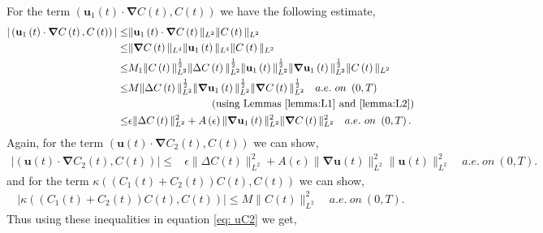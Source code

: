 \documentclass[final,3p,times]{elsarticle}
\theoremstyle{plain}
\theoremstyle{remark}
\theoremstyle{plain}
\theoremstyle{remark}
\begin{document}
For the term $\left(\mathbf u_1\left(t\right)\cdot\boldsymbol{\nabla} C\left(t\right),C\left(t\right)\right)$ we have the following estimate,
\begin{align}
    |\left(\mathbf u_1\left(t\right)\cdot\boldsymbol{\nabla} C\left(t\right),C\left(t\right)\right)|\le&\|\mathbf u_1\left(t\right) \cdot \boldsymbol{\nabla} C\left(t\right)\|_{L^2}\|C\left(t\right)\|_{L^2}\nonumber\\
    \le & \|\boldsymbol{\nabla} C\left(t\right)\|_{L^4}\|\mathbf u_1\left(t\right)\|_{L^4}\|C\left(t\right)\|_{L^2} \nonumber \\
    \le & M_1\| C\left(t\right)\|^{\frac{1}{2}}_{L^2}\|\Delta C\left(t\right)\|^{\frac{1}{2}}_{L^2}\|\mathbf u_1\left(t\right)\|^{\frac{1}{2}}_{L^2}\|\boldsymbol{\nabla}\mathbf u_1\left(t\right)\|^{\frac{1}{2}}_{L^2}\|C\left(t\right)\|_{L^2} \nonumber\\
    \le & M\|\Delta C\left(t\right)\|^{\frac{1}{2}}_{L^2}\|\boldsymbol{\nabla}\mathbf u_1\left(t\right)\|^{\frac{1}{2}}_{L^2} \|\boldsymbol{\nabla} C\left(t\right)\|^{\frac{1}{2}}_{L^2}\quad a.e.\ on\ \left(0,T\right) \nonumber \\ 
    & \qquad \qquad \qquad \qquad \text{(using Lemmas \ref{lemma:L1} and  \ref{lemma:L2})} \\
    \le & \epsilon \|\Delta C\left(t\right)\|^2_{L^2}+A\left(\epsilon\right) \|\boldsymbol{\nabla}\mathbf u_1\left(t\right)\|^2_{L^2} \|\boldsymbol{\nabla} C\left(t\right)\|^2_{L^2}\quad a.e.\ on\ \left(0,T\right).
\end{align}
Again, for the term $\left(\mathbf u\left(t\right) \cdot \boldsymbol{\nabla} C_2\left(t\right),C\left(t\right)\right)$ we can show,
\begin{align}
   \left\lvert  \left(\mathbf u\left(t\right) \cdot \boldsymbol{\nabla} C_2\left(t\right),C\left(t\right)\right) \right\rvert\le & \epsilon \|\Delta C\left(t\right)\|^2_{L^2}+A\left(\epsilon\right) \|\boldsymbol{\nabla}\mathbf u\left(t\right)\|^2_{L^2} \|\mathbf u\left(t\right)\|^2_{L^2}\quad a.e.\ on\ \left(0,T\right).
\end{align}
and for the term $\kappa \left(\left(C_1\left(t\right)+C_2\left(t\right)\right)C\left(t\right),C\left(t\right)\right)$ we can show,
\begin{align}
   | \kappa \left(\left(C_1\left(t\right)+C_2\left(t\right)\right)C\left(t\right),C\left(t\right)\right)|\le M \|C\left(t\right)\|^2_{L^2} \quad a.e.\ on\ \left(0,T\right) .
\end{align}
Thus using these inequalities in equation \eqref{eq: uC2} we get,
\end{document}
